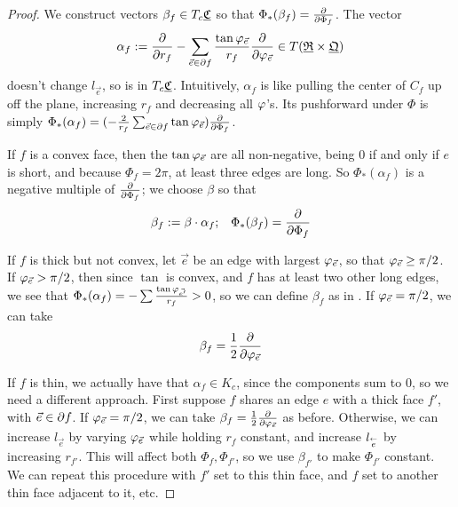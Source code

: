 \begin{proof}
We construct vectors $\beta_f \in T_c {\underline{\mathfrak{C}}}$ so that
$\Phi_*(\beta_f) = {\frac{\partial}{\partial \Phi_f}}$.
The vector
\begin{equation}
\label{e:alpha_f}
\alpha_f := {\frac{\partial}{\partial r_f}} - \sum_{\vec{e} \in \partial f} 
	\frac{\tan \varphi_{\vec{e}}}{r_f} {\frac{\partial}{\partial \varphi_{\vec{e}}}}
	\in T({\underline{\mathfrak{R}}} \times {\underline{\mathfrak{Q}}})
\end{equation}
doesn't change $l_{\vec{e}}$,
so is in $T_c {\underline{\mathfrak{C}}}$.
Intuitively, $\alpha_f$ is like
pulling the center of $C_f$ up off the plane, increasing $r_f$ and decreasing all
$\varphi$'s.
Its pushforward under $\Phi$ is simply
$\Phi_*(\alpha_f) =
	(-\frac{2}{r_f} \sum_{\vec{e}\in \partial f} \tan \varphi_{\vec{e}})
	{\frac{\partial}{\partial \Phi_f}}$.


If $f$ is a convex face, then the $\tan \varphi_{\vec{e}}$ are all non-negative,
being 0 if and only if $e$ is short,
and because $\Phi_f = 2\pi$, at least three edges are long.
So $\Phi_*(\alpha_f)$ is a negative multiple of ${\frac{\partial}{\partial \Phi_f}}$;
we choose $\beta$ so that
\begin{equation}
\label{e:beta_f_convex}
\beta_f := \beta \cdot \alpha_f; \;\;\;
\Phi_*(\beta_f) = {\frac{\partial}{\partial \Phi_f}}
\end{equation}

If $f$ is thick but not convex,
let $\vec{e}$ be an edge with largest $\varphi_{\vec{e}}$,
so that $\varphi_{\vec{e}} \geq \pi/2$.
If $\varphi_{\vec{e}} > \pi/2$,
then since $\tan$ is convex, and $f$ has at least two other
long edges,
we see that $\Phi_*(\alpha_f) = -\sum \frac{\tan \varphi_{\vec{e'}}}{r_f} > 0$,
so we can define $\beta_f$ as in .
If $\varphi_{\vec{e}} = \pi/2$,
we can take
\[
\beta_f = \frac{1}{2} {\frac{\partial}{\partial \varphi_{\vec{e}}}}
\]



If $f$ is thin, we actually have that $\alpha_f \in K_c$,
since the components sum to 0, so we need a different approach.
First suppose $f$ shares an edge $e$ with a thick face $f'$,
with $\vec{e} \in \partial f$.
If $\varphi_{\vec{e}} = \pi/2$, we can take
$\beta_f = \frac{1}{2} {\frac{\partial}{\partial \varphi_{\vec{e}}}}$ as before.
Otherwise, we can increase $l_{\vec{e}}$
by varying $\varphi_{\vec{e}}$
while holding $r_f$ constant,
and increase $l_{\overset{\leftarrow}{e}}$
by increasing $r_{f'}$.
This will affect both $\Phi_f, \Phi_{f'}$,
so we use $\beta_{f'}$ to make $\Phi_{f'}$ constant.
We can repeat this procedure with $f'$ set to this thin face,
and $f$ set to another thin face adjacent to it, etc.
\end{proof}

